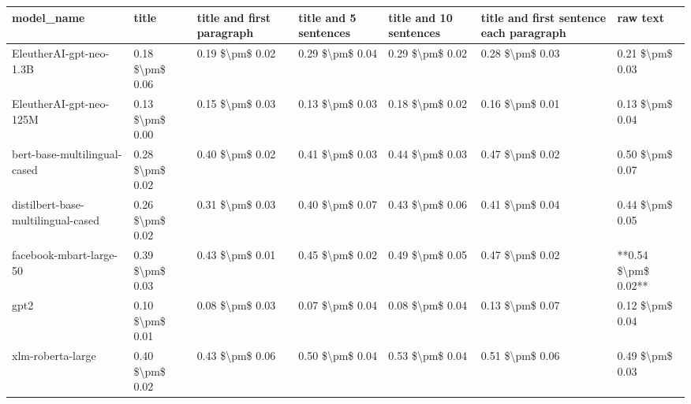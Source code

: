 \begin{tabular}{lllllll}
\toprule
                        model\_name &           title & title and first paragraph & title and 5 sentences & title and 10 sentences & title and first sentence each paragraph &            raw text \\
\midrule
           EleutherAI-gpt-neo-1.3B & 0.18 \$\textbackslash pm\$ 0.06 &           0.19 \$\textbackslash pm\$ 0.02 &       0.29 \$\textbackslash pm\$ 0.04 &        0.29 \$\textbackslash pm\$ 0.02 &                         0.28 \$\textbackslash pm\$ 0.03 &     0.21 \$\textbackslash pm\$ 0.03 \\
           EleutherAI-gpt-neo-125M & 0.13 \$\textbackslash pm\$ 0.00 &           0.15 \$\textbackslash pm\$ 0.03 &       0.13 \$\textbackslash pm\$ 0.03 &        0.18 \$\textbackslash pm\$ 0.02 &                         0.16 \$\textbackslash pm\$ 0.01 &     0.13 \$\textbackslash pm\$ 0.04 \\
      bert-base-multilingual-cased & 0.28 \$\textbackslash pm\$ 0.02 &           0.40 \$\textbackslash pm\$ 0.02 &       0.41 \$\textbackslash pm\$ 0.03 &        0.44 \$\textbackslash pm\$ 0.03 &                         0.47 \$\textbackslash pm\$ 0.02 &     0.50 \$\textbackslash pm\$ 0.07 \\
distilbert-base-multilingual-cased & 0.26 \$\textbackslash pm\$ 0.02 &           0.31 \$\textbackslash pm\$ 0.03 &       0.40 \$\textbackslash pm\$ 0.07 &        0.43 \$\textbackslash pm\$ 0.06 &                         0.41 \$\textbackslash pm\$ 0.04 &     0.44 \$\textbackslash pm\$ 0.05 \\
           facebook-mbart-large-50 & 0.39 \$\textbackslash pm\$ 0.03 &           0.43 \$\textbackslash pm\$ 0.01 &       0.45 \$\textbackslash pm\$ 0.02 &        0.49 \$\textbackslash pm\$ 0.05 &                         0.47 \$\textbackslash pm\$ 0.02 & **0.54 \$\textbackslash pm\$ 0.02** \\
                              gpt2 & 0.10 \$\textbackslash pm\$ 0.01 &           0.08 \$\textbackslash pm\$ 0.03 &       0.07 \$\textbackslash pm\$ 0.04 &        0.08 \$\textbackslash pm\$ 0.04 &                         0.13 \$\textbackslash pm\$ 0.07 &     0.12 \$\textbackslash pm\$ 0.04 \\
                 xlm-roberta-large & 0.40 \$\textbackslash pm\$ 0.02 &           0.43 \$\textbackslash pm\$ 0.06 &       0.50 \$\textbackslash pm\$ 0.04 &        0.53 \$\textbackslash pm\$ 0.04 &                         0.51 \$\textbackslash pm\$ 0.06 &     0.49 \$\textbackslash pm\$ 0.03 \\
\bottomrule
\end{tabular}
